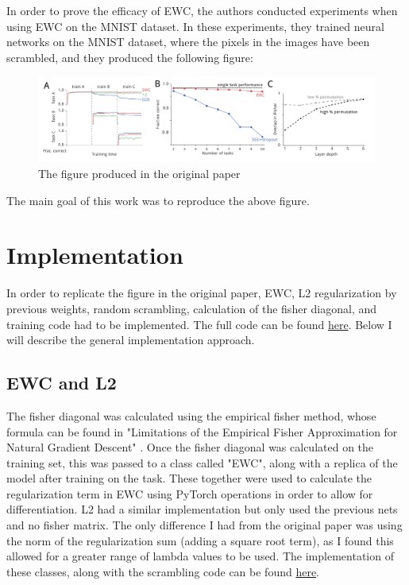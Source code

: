 \documentclass{article}
\begin{document}
In order to prove the efficacy of EWC, the authors conducted experiments when using EWC on the MNIST dataset. In these experiments, they trained neural networks on the MNIST dataset, where the pixels in the images have been scrambled, and they produced the following figure:

\begin{figure}[h]
\centering
\includegraphics[scale=0.25]{../Figures/Orig_All.png}
\caption{The figure produced in the original paper}
\label{fig:orig_all}
\end{figure}

The main goal of this work was to reproduce the above figure.

\section{Implementation}

In order to replicate the figure in the original paper, EWC, L2 regularization by previous weights, random scrambling, calculation of the fisher diagonal, and training code had to be implemented. The full code can be found \href{http://www.overleaf.com}{here}. Below I will describe the general implementation approach.


\subsection{EWC and L2}

The fisher diagonal was calculated using the empirical fisher method, whose formula can be found in "Limitations of the Empirical Fisher Approximation for Natural Gradient Descent" \cite{empirical}. Once the fisher diagonal was calculated on the training set, this was passed to a class called "EWC", along with a replica of the model after training on the task. These together were used to calculate the regularization term in EWC using PyTorch operations in order to allow for differentiation. L2 had a similar implementation but only used the previous nets and no fisher matrix. The only difference I had from the original paper was using the norm of the regularization sum (adding a square root term), as I found this allowed for a greater range of lambda values to be used. The implementation of these classes, along with the scrambling code can be found \href{http://example.com}{here}.
\end{document}
